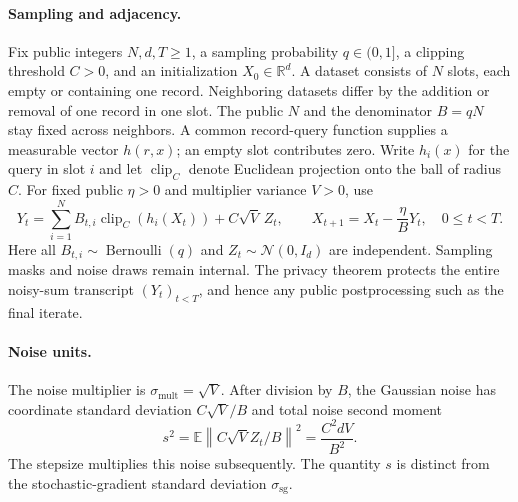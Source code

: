 \documentclass[11pt]{article}
\newcommand{\R}{\mathbb R}
\newcommand{\E}{\mathbb E}
\newcommand{\N}{\mathcal N}
\newcommand{\norm}[1]{\left\lVert #1\right\rVert}
\newcommand{\clip}{\operatorname{clip}}
\newcommand{\sg}{\mathrm{sg}}
\begin{document}
\paragraph{Sampling and adjacency.}
Fix public integers $N,d,T\ge1$, a sampling probability $q\in(0,1]$, a
clipping threshold $C>0$, and an initialization $X_0\in\R^d$.
A dataset consists of $N$ slots, each empty or containing one record.
Neighboring datasets differ by the addition or removal of one record in one
slot. The public $N$ and the denominator $B=qN$ stay fixed across neighbors.
A common record-query function supplies a measurable vector $h(r,x)$;
an empty slot contributes zero. Write $h_i(x)$ for the query in slot $i$ and
let $\clip_C$ denote Euclidean projection onto the ball of radius $C$.
For fixed public $\eta>0$ and multiplier variance $V>0$, use
\begin{equation}\label{eq:algorithm}
 Y_t=\sum_{i=1}^N B_{t,i}\clip_C(h_i(X_t))+C\sqrt V\,Z_t,
 \qquad X_{t+1}=X_t-\frac{\eta}{B}Y_t,
 \quad 0\le t<T.
\end{equation}
Here all $B_{t,i}\sim\operatorname{Bernoulli}(q)$ and $Z_t\sim\N(0,I_d)$
are independent. Sampling masks and noise draws remain internal. The
privacy theorem protects the entire noisy-sum transcript $(Y_t)_{t<T}$,
and hence any public postprocessing such as the final iterate.

\paragraph{Noise units.}
The noise multiplier is $\sigma_{\mathrm{mult}}=\sqrt V$.
After division by $B$, the Gaussian noise has coordinate standard deviation
$C\sqrt V/B$ and total noise second moment
\begin{equation}\label{eq:noise}
 s^2=\E\norm{C\sqrt V Z_t/B}^2=\frac{C^2dV}{B^2}.
\end{equation}
The stepsize multiplies this noise subsequently. The quantity $s$ is
distinct from the stochastic-gradient standard deviation $\sigma_{\sg}$.
\end{document}
